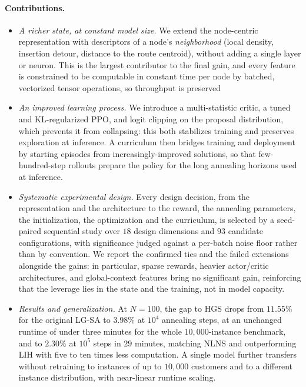 \documentclass[letterpaper]{article} %
\begin{document}
\paragraph{Contributions.}
\begin{itemize}
\item \emph{A richer state, at constant model size.} We extend the node-centric representation with descriptors of a node's \emph{neighborhood} (local density, insertion detour, distance to the route centroid), without adding a single layer or neuron. This is the largest contributor to the final gain, and every feature is constrained to be computable in constant time per node by batched, vectorized tensor operations, so throughput is preserved
\item \emph{An improved learning process.} We introduce a multi-statistic
critic, a tuned and KL-regularized PPO, and logit clipping on the proposal
distribution, which prevents it from collapsing: this both stabilizes
training and preserves exploration at inference. A curriculum then bridges
training and deployment by starting
episodes from increasingly-improved solutions, so that
few-hundred-step rollouts prepare the policy for the long annealing
horizons used at inference.
\item \emph{Systematic experimental design.} Every design decision, from the representation and the architecture to the reward, the annealing parameters, the initialization, the optimization and the curriculum, is selected by a seed-paired sequential study over $18$ design dimensions and $93$ candidate configurations, with significance judged against a per-batch noise floor rather than by convention. We report the confirmed ties and the failed extensions alongside the gains: in particular, sparse rewards, heavier actor/critic architectures, and global-context features bring no significant gain, reinforcing that the leverage lies in the state and the training, not in model capacity.
\item \emph{Results and generalization.} At $N=100$, the gap to HGS drops from $11.55\%$ for the original LG-SA to $3.98\%$ at $10^4$ annealing steps, at an unchanged runtime of under three minutes for the whole $10{,}000$-instance benchmark, and to $2.30\%$ at $10^5$ steps in $29$ minutes, matching NLNS and outperforming LIH with five to ten times less computation. A single model further transfers without retraining to instances of up to $10{,}000$ customers and to a different instance distribution, with near-linear runtime scaling.
\end{itemize}
\end{document}
